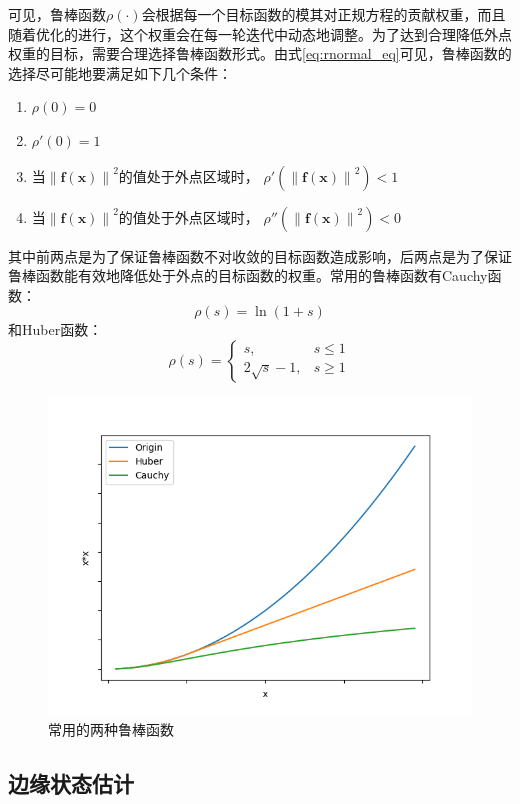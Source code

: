 可见，鲁棒函数$\rho(\cdot)$会根据每一个目标函数的模其对正规方程的贡献权重，而且随着优化的进行，这个权重会在每一轮迭代中动态地调整。为了达到合理降低外点权重的目标，需要合理选择鲁棒函数形式。由式\eqref{eq:rnormal_eq}可见，鲁棒函数的选择尽可能地要满足如下几个条件\citep{triggs1999bundle,zhang1995parameter}：
\begin{enumerate}
    \item $\rho(0)=0$
    \item $\rho'(0)=1$
    \item 当$\left\|\bm{f}(\bm{x})\right\|^2$的值处于外点区域时，
          $\rho'(\left\|\bm{f}(\bm{x})\right\|^2)<1$
    \item 当$\left\|\bm{f}(\bm{x})\right\|^2$的值处于外点区域时，
          $\rho''(\left\|\bm{f}(\bm{x})\right\|^2)<0$
\end{enumerate}
其中前两点是为了保证鲁棒函数不对收敛的目标函数造成影响，后两点是为了保证鲁棒函数能有效地降低处于外点的目标函数的权重。常用的鲁棒函数有Cauchy函数：
\begin{equation}
    \rho(s) = \ln(1+s)
\end{equation}
和Huber函数：
\begin{equation}
    \rho(s) =
    \left\{
    \begin{array}{ll}
        s, & s \leq 1 \\
        2\sqrt{s}-1, & s \geq 1
    \end{array}
    \right.
\end{equation}

\begin{figure}[htb!]
    \centering
    \includegraphics[width=.6\textwidth]{figs/robust.png}
    \caption{常用的两种鲁棒函数}
    \label{fig:robust}
\end{figure}

\subsection{边缘状态估计}


